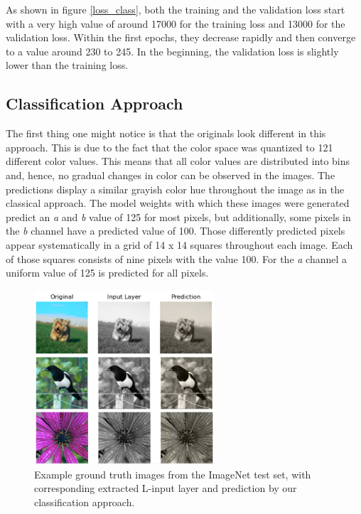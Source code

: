 \documentclass[12pt,letterpaper]{article}
\begin{document}
As shown in figure \ref{loss_class},  both the training and the validation loss start with a very high value of around 17000 for the training loss and 13000 for the validation loss. Within the first epochs, they decrease rapidly and then converge to a value around 230 to 245. In the beginning, the validation loss is slightly lower than the training loss.

\subsection{Classification Approach}
The first thing one might notice is that the originals look different in this approach. This is due to the fact that the color space was quantized to 121 different color values. This means that all color values are distributed into bins and, hence, no gradual changes in color can be observed in the images. The predictions display a similar grayish color hue throughout the image as in the classical approach. The model weights with which these images were generated predict an \emph{a} and \emph{b} value of 125 for most pixels, but additionally, some pixels in the \emph{b} channel have a predicted value of 100. Those differently predicted pixels appear systematically in a grid of 14 x 14 squares throughout each image. Each of those squares consists of nine pixels with the value 100. For the \emph{a} channel a uniform value of 125 is predicted for all pixels.
\begin{figure}[hbt]
	\centering
	\includegraphics[width=0.6\textwidth]{classific_predict.png}
	\caption{Example ground truth images from the ImageNet test set, with corresponding extracted L-input layer and prediction by our classification approach.}
	\label{classificatio}
\end{figure}
\end{document}
